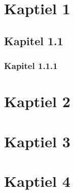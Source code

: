 



\tableofcontents

\newpage

\section{Kaptiel 1}
\subsection{Kapitel 1.1}
\subsubsection{Kapitel 1.1.1}
\section{Kaptiel 2}
\section{Kaptiel 3}
\section{Kaptiel 4}


%
%
%
%
%
%

